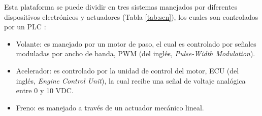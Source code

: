 \begin{table}[H]
  \centering
{}%
  \caption{Características físicas del Twizy 80}
  \label{tab:cart}%
\end{table}%



\par Esta plataforma se puede dividir en tres sistemas manejados por diferentes dispositivos electrónicos y actuadores (Tabla \ref{tab:sen}), los cuales son controlados por un PLC \cite{marcanolow}:

\begin{itemize}
\item Volante: es manejado por un motor de paso, el cual es controlado por señales moduladas por ancho de banda, PWM (del inglés, \textit{Pulse-Width Modulation}). 
\item Acelerador: es controlado por la unidad de control del motor, ECU (del inglés, \textit{Engine Control Unit}), la cual recibe una señal de voltaje analógica entre 0 y 10 VDC. 
\item Freno: es manejado a través de un actuador mecánico lineal.
\end{itemize} 

